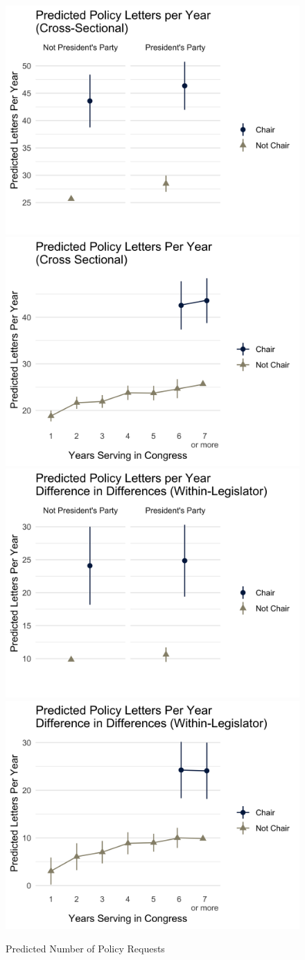 \begin{figure}[hbt!]
\centering
\caption{Predicted Number of Policy Requests} \label{f:m-policy-predicted}
\includegraphics[width = .48\textwidth]{figs/m-policy-predicted-1} 
\includegraphics[width = .48\textwidth]{figs/m-policy-predicted-2} 
\includegraphics[width = .48\textwidth]{figs/m-policy-predicted-3} 
\includegraphics[width = .48\textwidth]{figs/m-policy-predicted-4} 

\end{figure}


